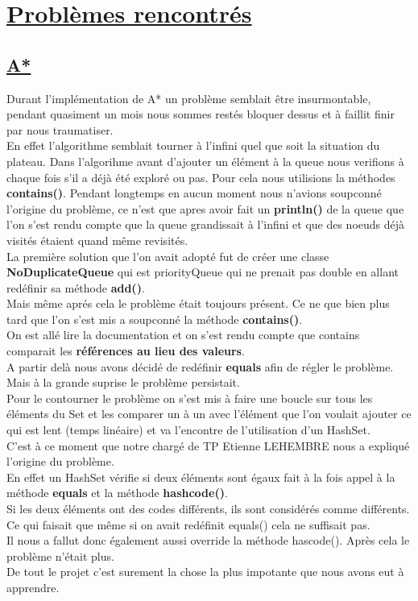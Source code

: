 \documentclass[12pt]{article}
\begin{document}
	\newpage
	\section{\underline{Problèmes rencontrés}}
	\subsection{\underline{A*}}
	Durant l'implémentation de A* un problème semblait être insurmontable, pendant quasiment un mois nous sommes restés bloquer dessus et à
	faillit finir par nous traumatiser.\\
	En effet l'algorithme semblait tourner à l'infini quel que soit la situation du plateau. Dans l'algorihme avant d'ajouter
	un élément à la queue nous verifions à chaque fois s'il a déjà été exploré ou pas. Pour cela nous utilisions la méthodes
	\textbf{contains()}. Pendant longtemps en aucun moment nous n'avions soupconné l'origine du problème, ce n'est que apres avoir fait un 
	\textbf{println()} de la queue que l'on s'est rendu compte que la queue grandissait à l'infini et que des noeuds déjà visités étaient 
	quand même revisités.\\
	La première solution que l'on avait adopté fut de créer une classe \textbf{NoDuplicateQueue} qui est priorityQueue qui ne prenait pas 
	double en allant redéfinir sa méthode \textbf{add()}.\\ 
	Mais même aprés cela le problème était toujours présent. Ce ne que bien plus tard que l'on
	s'est mis a soupconné la méthode \textbf{contains()}.\\ 
	On est allé lire la documentation et on s'est rendu compte que contains comparait
	les \textbf{références au lieu des valeurs}.\\ 
	A partir delà nous avons décidé de redéfinir \textbf{equals} afin de régler le problème. Mais
	à la grande suprise le problème persistait.\\ 
	Pour le contourner le problème on s'est mis à faire une boucle sur tous les éléments du Set et les comparer un à un avec l'élément que 
	l'on voulait ajouter ce qui est  lent (temps linéaire) et va l'encontre de l'utilisation d'un HashSet.\\
	C'est à ce moment que notre chargé de TP Etienne LEHEMBRE nous a expliqué l'origine du problème.\\
	En effet un HashSet vérifie si deux éléments sont égaux fait à la fois appel à la méthode \textbf{equals} et la méthode \textbf{hashcode()}.\\
	Si les deux éléments ont des codes différents, ils sont considérés comme différents. Ce qui faisait que même si on avait redéfinit
	equals() cela ne suffisait pas.\\
	Il nous a fallut donc également aussi override la méthode hascode(). Après cela le problème n'était plus. \\
	De tout le projet c'est surement la chose la plus impotante que nous avons eut à apprendre.
\end{document}
